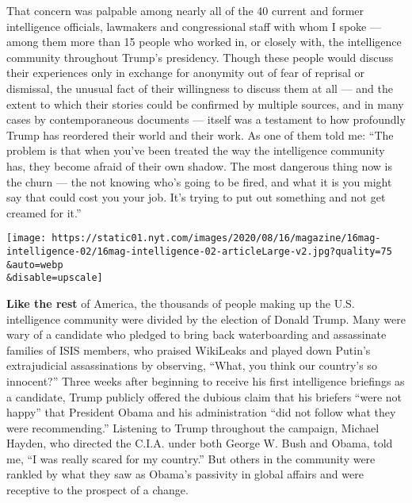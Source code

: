 That concern was palpable among nearly all of the 40 current and former
intelligence officials, lawmakers and congressional staff with whom I
spoke --- among them more than 15 people who worked in, or closely with,
the intelligence community throughout Trump's presidency. Though these
people would discuss their experiences only in exchange for anonymity
out of fear of reprisal or dismissal, the unusual fact of their
willingness to discuss them at all --- and the extent to which their
stories could be confirmed by multiple sources, and in many cases by
contemporaneous documents --- itself was a testament to how profoundly
Trump has reordered their world and their work. As one of them told me:
``The problem is that when you've been treated the way the intelligence
community has, they become afraid of their own shadow. The most
dangerous thing now is the churn --- the not knowing who's going to be
fired, and what it is you might say that could cost you your job. It's
trying to put out something and not get creamed for it.''

\texttt{[image: https://static01.nyt.com/images/2020/08/16/magazine/16mag-intelligence-02/16mag-intelligence-02-articleLarge-v2.jpg?quality=75\\\&auto=webp\\\&disable=upscale]}

\textbf{Like the rest} of America, the thousands of people making up the
U.S. intelligence community were divided by the election of Donald
Trump. Many were wary of a candidate who pledged to bring back
waterboarding and assassinate families of ISIS members, who praised
WikiLeaks and played down Putin's extrajudicial assassinations by
observing, ``What, you think our country's so innocent?'' Three weeks
after beginning to receive his first intelligence briefings as a
candidate, Trump publicly offered the dubious claim that his briefers
``were not happy'' that President Obama and his administration ``did not
follow what they were recommending.'' Listening to Trump throughout the
campaign, Michael Hayden, who directed the C.I.A. under both George W.
Bush and Obama, told me, ``I was really scared for my country.'' But
others in the community were rankled by what they saw as Obama's
passivity in global affairs and were receptive to the prospect of a
change.

